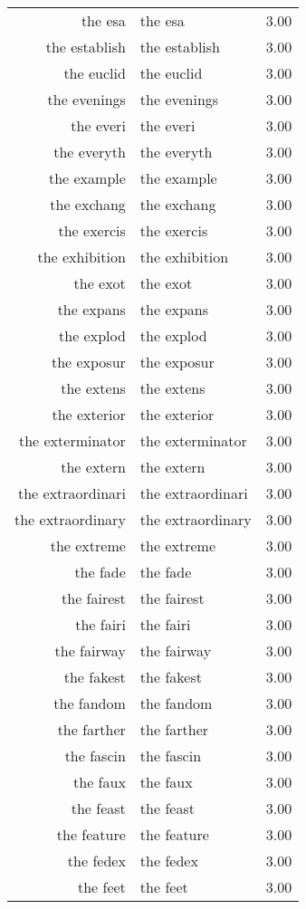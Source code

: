 \begin{table}[ht]
\begin{tabular}{rlr}
  the esa & the esa & 3.00 \\ 
  the establish & the establish & 3.00 \\ 
  the euclid & the euclid & 3.00 \\ 
  the evenings & the evenings & 3.00 \\ 
  the everi & the everi & 3.00 \\ 
  the everyth & the everyth & 3.00 \\ 
  the example & the example & 3.00 \\ 
  the exchang & the exchang & 3.00 \\ 
  the exercis & the exercis & 3.00 \\ 
  the exhibition & the exhibition & 3.00 \\ 
  the exot & the exot & 3.00 \\ 
  the expans & the expans & 3.00 \\ 
  the explod & the explod & 3.00 \\ 
  the exposur & the exposur & 3.00 \\ 
  the extens & the extens & 3.00 \\ 
  the exterior & the exterior & 3.00 \\ 
  the exterminator & the exterminator & 3.00 \\ 
  the extern & the extern & 3.00 \\ 
  the extraordinari & the extraordinari & 3.00 \\ 
  the extraordinary & the extraordinary & 3.00 \\ 
  the extreme & the extreme & 3.00 \\ 
  the fade & the fade & 3.00 \\ 
  the fairest & the fairest & 3.00 \\ 
  the fairi & the fairi & 3.00 \\ 
  the fairway & the fairway & 3.00 \\ 
  the fakest & the fakest & 3.00 \\ 
  the fandom & the fandom & 3.00 \\ 
  the farther & the farther & 3.00 \\ 
  the fascin & the fascin & 3.00 \\ 
  the faux & the faux & 3.00 \\ 
  the feast & the feast & 3.00 \\ 
  the feature & the feature & 3.00 \\ 
  the fedex & the fedex & 3.00 \\ 
  the feet & the feet & 3.00 \\ 

\end{tabular}
\end{table}
